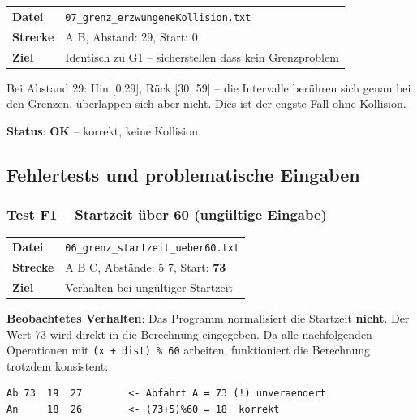 \documentclass[12pt,a4paper]{article}
\newcommand{\pass}{\textcolor{passgreen}{\textbf{OK}}}
\begin{document}
\begin{center}
\begin{tabular}{ll}
\toprule
\textbf{Datei} & \texttt{07\_grenz\_erzwungeneKollision.txt} \\
\textbf{Strecke} & A B, Abstand: 29, Start: 0 \\
\textbf{Ziel} & Identisch zu G1 -- sicherstellen dass kein Grenzproblem \\
\bottomrule
\end{tabular}
\end{center}

Bei Abstand 29: Hin [0,29], Rück [30, 59] -- die Intervalle berühren sich genau bei den Grenzen, überlappen sich aber nicht. Dies ist der engste Fall ohne Kollision.

\textbf{Status}: \pass{} -- korrekt, keine Kollision.

\subsection{Fehlertests und problematische Eingaben}

\subsubsection{Test F1 -- Startzeit über 60 (ungültige Eingabe)}

\begin{center}
\begin{tabular}{ll}
\toprule
\textbf{Datei} & \texttt{06\_grenz\_startzeit\_ueber60.txt} \\
\textbf{Strecke} & A B C, Abstände: 5 7, Start: \textbf{73} \\
\textbf{Ziel} & Verhalten bei ungültiger Startzeit \\
\bottomrule
\end{tabular}
\end{center}

\textbf{Beobachtetes Verhalten}: Das Programm normalisiert die Startzeit \textbf{nicht}. Der Wert 73 wird direkt in die Berechnung eingegeben. Da alle nachfolgenden Operationen mit \texttt{(x + dist) \% 60} arbeiten, funktioniert die Berechnung trotzdem konsistent:

\begin{lstlisting}[caption={Ausgabe F1 -- Startzeit 73 nicht normalisiert}]
Ab 73  19  27        <- Abfahrt A = 73 (!) unveraendert
An     18  26        <- (73+5)%60 = 18  korrekt
\end{lstlisting}
\end{document}
